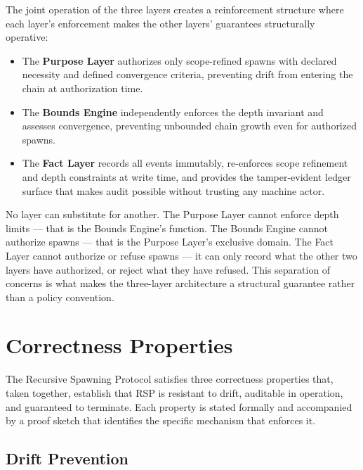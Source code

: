 The joint operation of the three layers creates a reinforcement structure where each layer's enforcement makes the other layers' guarantees structurally operative:

\begin{itemize}
    \item The \textbf{Purpose Layer} authorizes only scope-refined spawns with declared necessity and defined convergence criteria, preventing drift from entering the chain at authorization time.
    \item The \textbf{Bounds Engine} independently enforces the depth invariant and assesses convergence, preventing unbounded chain growth even for authorized spawns.
    \item The \textbf{Fact Layer} records all events immutably, re-enforces scope refinement and depth constraints at write time, and provides the tamper-evident ledger surface that makes audit possible without trusting any machine actor.
\end{itemize}

No layer can substitute for another. The Purpose Layer cannot enforce depth limits — that is the Bounds Engine's function. The Bounds Engine cannot authorize spawns — that is the Purpose Layer's exclusive domain. The Fact Layer cannot authorize or refuse spawns — it can only record what the other two layers have authorized, or reject what they have refused. This separation of concerns is what makes the three-layer architecture a structural guarantee rather than a policy convention.

\section{Correctness Properties}
\label{sec:rs-correctness}

The Recursive Spawning Protocol satisfies three correctness properties that, taken together, establish that RSP is resistant to drift, auditable in operation, and guaranteed to terminate. Each property is stated formally and accompanied by a proof sketch that identifies the specific mechanism that enforces it.

\subsection{Drift Prevention}
\label{sec:rs-drift-prevention}

